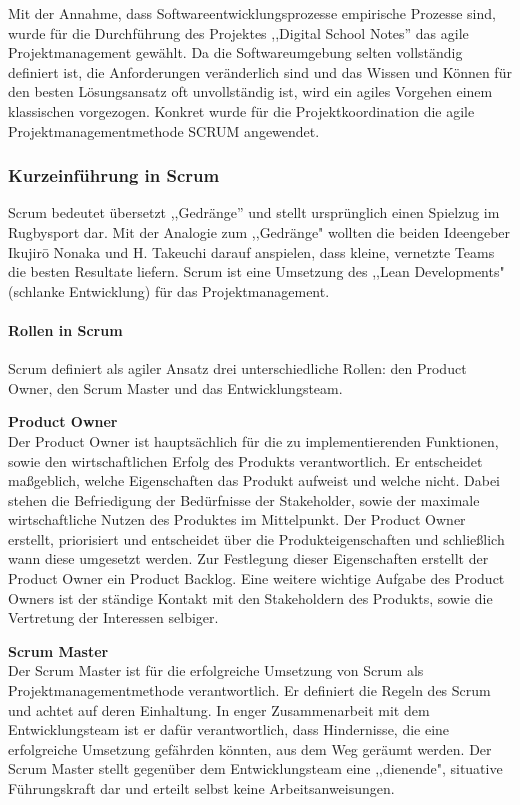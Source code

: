 Mit der Annahme, dass Softwareentwicklungsprozesse empirische Prozesse sind, wurde für die Durchführung des Projektes ,,Digital School Notes'' das agile Projektmanagement gewählt. Da die Softwareumgebung selten vollständig definiert ist, die Anforderungen veränderlich sind und das Wissen und Können für den besten Lösungsansatz oft unvollständig ist, wird ein agiles Vorgehen einem klassischen vorgezogen. Konkret wurde für die Projektkoordination die agile Projektmanagementmethode SCRUM angewendet.


\subsubsection{Kurzeinführung in Scrum}
Scrum bedeutet übersetzt ,,Gedränge'' und stellt ursprünglich einen Spielzug im Rugbysport dar. Mit der Analogie zum ,,Gedränge" wollten die beiden Ideengeber  Ikujirō Nonaka und H. Takeuchi darauf anspielen, dass kleine, vernetzte Teams die besten Resultate liefern. Scrum ist eine Umsetzung des ,,Lean Developments" (schlanke Entwicklung) für das Projektmanagement.
\paragraph{Rollen in Scrum}
Scrum definiert als agiler Ansatz drei unterschiedliche Rollen: den Product Owner, den Scrum Master und das Entwicklungsteam.

\textbf{Product Owner}\\
Der Product Owner ist hauptsächlich für die zu implementierenden Funktionen, sowie den wirtschaftlichen Erfolg des Produkts verantwortlich. Er entscheidet maßgeblich, welche Eigenschaften das Produkt aufweist und welche nicht. Dabei stehen die Befriedigung der Bedürfnisse der Stakeholder, sowie der maximale wirtschaftliche Nutzen des Produktes im Mittelpunkt. Der Product Owner erstellt, priorisiert und entscheidet über die Produkteigenschaften und schließlich wann diese umgesetzt werden. Zur Festlegung dieser Eigenschaften erstellt der Product Owner ein Product Backlog. Eine weitere wichtige Aufgabe des Product Owners ist der ständige Kontakt mit den Stakeholdern des Produkts, sowie die Vertretung der Interessen selbiger. 

\textbf{Scrum Master}\\
Der Scrum Master ist für die erfolgreiche Umsetzung von Scrum als Projektmanagementmethode verantwortlich. Er definiert die Regeln des Scrum und achtet auf deren Einhaltung. In enger Zusammenarbeit mit dem Entwicklungsteam ist er dafür verantwortlich, dass Hindernisse, die eine erfolgreiche Umsetzung gefährden könnten, aus dem Weg geräumt werden. Der Scrum Master stellt gegenüber dem Entwicklungsteam eine ,,dienende", situative Führungskraft dar und erteilt selbst keine Arbeitsanweisungen.


